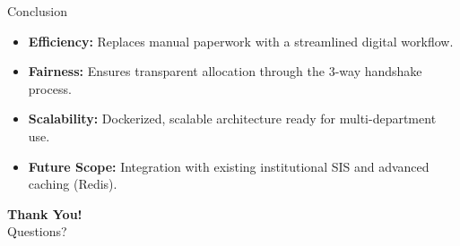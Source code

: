 \documentclass[aspectratio=169]{beamer}
\begin{document}
\begin{frame}{Conclusion}
    \begin{itemize}
        \item \textbf{Efficiency:} Replaces manual paperwork with a streamlined digital workflow.
        \item \textbf{Fairness:} Ensures transparent allocation through the 3-way handshake process.
        \item \textbf{Scalability:} Dockerized, scalable architecture ready for multi-department use.
        \item \textbf{Future Scope:} Integration with existing institutional SIS and advanced caching (Redis).
    \end{itemize}
\end{frame}

\begin{frame}
    \begin{center}
        \Huge \textbf{Thank You!}\\
        \vspace{0.5cm}
        \Large Questions?
    \end{center}
\end{frame}
\end{document}
